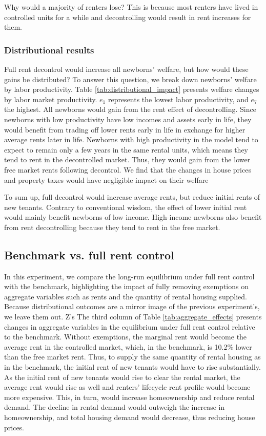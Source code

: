 \documentclass[parskip=full]{article}
\begin{document}
Why would a majority of renters lose? This is because most renters have lived in controlled units for a while and decontrolling would result in rent increases for them.  

\subsubsection{Distributional results} 

Full rent decontrol would increase all newborns' welfare, but how would these gains be distributed? To answer this question, we break down newborns' welfare by labor productivity. Table \ref{tab:distributional_impact} presents welfare changes by labor market productivity. $e_{1}$ represents the lowest labor productivity, and $e_{7}$ the highest. All newborns would gain from the rent effect of decontrolling. Since newborns with low productivity have low incomes and assets early in life, they would benefit from trading off lower rents early in life in exchange for higher average rents later in life. Newborns with high productivity in the model tend to expect to remain only a few years in the same rental units, which means they tend to rent in the decontrolled market. Thus, they would gain from the lower free market rents following decontrol. We find that the changes in house prices and property taxes would have negligible impact on their welfare 

To sum up, full decontrol would increase average rents, but reduce initial rents of new tenants. Contrary to conventional wisdom, the effect of lower initial rent would mainly benefit newborns of low income. High-income newborns also benefit from rent decontrolling because they tend to rent in the free market.

\subsection{Benchmark vs. full rent control}\label{subsection:full_control}

In this experiment, we compare the long-run equilibrium under full rent control with the benchmark, highlighting the impact of fully removing exemptions on aggregate variables such as rents and the quantity of rental housing supplied. Because distributional outcomes are a mirror image of the previous experiment's, we leave them out.
Z's
The third column of Table \ref{tab:aggregate_effects} presents changes in aggregate variables in the equilibrium under full rent control relative to the benchmark. Without exemptions, the marginal rent would become the average rent in the controlled market, which, in the benchmark, is 10.2\% lower than the free market rent. Thus, to supply the same quantity of rental housing as in the benchmark, the initial rent of new tenants would have to rise substantially. As the initial rent of new tenants would rise to clear the rental market, the average rent would rise as well and renters' lifecycle rent profile would become more expensive. This, in turn, would increase homeownership and reduce rental demand. The decline in rental demand would outweigh the increase in homeownership, and total housing demand would decrease, thus reducing house prices. 
\end{document}
